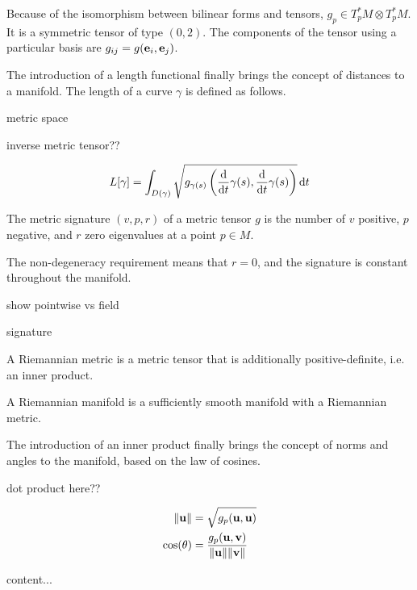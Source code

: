 Because of the isomorphism between bilinear forms and tensors, $g_{p} \in T_{p}^{*} M \otimes T_{p}^{*} M$. It is a symmetric tensor of type $(0, 2)$. The components of the tensor using a particular basis are $g_{ij} = g(\vb{e}_{i}, \vb{e}_{j})$.

The introduction of a length functional finally brings the concept of distances to a manifold. The length of a curve $\gamma$ is defined as follows.

metric space

inverse metric tensor??

\begin{equation}
	L[\gamma] = \int_{D(\gamma)} \sqrt{g_{\gamma(s)}\left(\dv{t} \gamma(s), \dv{t} \gamma(s)\right)} \dd{t}
\end{equation}

\begin{definition}
	The metric signature $(v, p, r)$ of a metric tensor $g$ is the number of $v$ positive, $p$ negative, and $r$ zero eigenvalues at a point $p \in M$.
\end{definition}

The non-degeneracy requirement means that $r = 0$, and the signature is constant throughout the manifold.

show pointwise vs field

signature

\begin{definition}
	A Riemannian metric is a metric tensor that is additionally positive-definite, i.e. an inner product.
\end{definition}

\begin{definition}
A Riemannian manifold is a sufficiently smooth manifold with a Riemannian metric.
\end{definition}

The introduction of an inner product finally brings the concept of norms and angles to the manifold, based on the law of cosines.

dot product here??

\begin{align}
	\norm{\vb{u}} &= \sqrt{g_{p}(\vb{u}, \vb{u})} \\
	\cos(\theta) &= \frac{g_{p} (\vb{u}, \vb{v})}{\norm{\vb{u}} \norm{\vb{v}}}
\end{align}

\begin{definition}
	content...
\end{definition}

